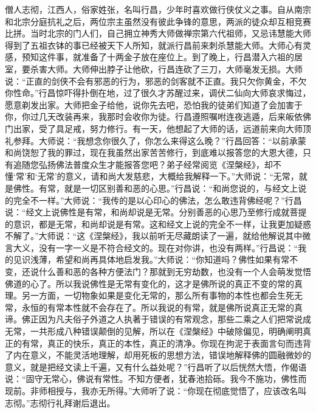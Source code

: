 \documentclass[12pt,twoside,openany]{book}
\newcommand{\kai}[1]{{\CJKfamily{kai}#1}}
\begin{document}
\kai{僧人志彻，江西人，俗家姓张，名叫行昌，少年时喜欢做行侠仗义之事。自从南宗和北宗分庭抗礼之后，两位宗主虽然没有彼此争锋的意思，两派的徒众却互相竞赛比拼。当时北宗的门人们，自己拥立神秀大师做禅宗第六代祖师，又忌讳慧能大师得到了五祖衣钵的事已经被天下人所知，就派行昌前来刺杀慧能大师。大师心有灵感，预知这件事，就准备了十两金子放在座位上。到了晚上，行昌潜入六祖的居室，要杀害大师。大师伸出脖子让他砍，行昌连砍了三刀，大师毫发无损。大师说：“正直的剑侠不会有邪恶的行为，邪恶的剑客就不正直。我只欠你黄金，不欠你性命。”行昌惊吓得扑倒在地，过了很久才苏醒过来，调伏二仙向大师哀求悔过，愿意剃发出家。大师把金子给他，说你先去吧，恐怕我的徒弟们知道了会加害于你，你过几天改装再来，我那时会收你为徒。行昌遵照嘱咐连夜逃遁，后来皈依佛门出家，受了具足戒，努力修行。有一天，他想起了大师的话，远道前来向大师顶礼参拜。大师说：“我想念你很久了，你怎么来得这么晚？”行昌回答：“以前承蒙和尚饶恕了我的罪过，现在我虽然出家苦苦修行，到底难以报答您的大恩大德，只有追随您弘扬佛法普度众生才能报答您吧？弟子经常阅览《涅槃经》，却不懂‘常’和‘无常’的意义，请和尚大发慈悲，大概给我解释一下。”大师说：“无常，就是佛性。有常，就是一切区别善和恶的心思。”行昌说：“和尚您说的，与经文上说的完全不一样。”大师说：“我传的是以心印心的佛法，怎么敢违背佛经呢？”行昌说：“经文上说佛性是有常，和尚却说是无常。分别善恶的心思乃至修行成就菩提的意识，都是无常，和尚却说是有常。这和经文上说的完全不一样，让我更加疑惑不解了。”大师说：“这《涅槃经》，我以前听无尽藏朗读了一遍，就给他解说其中微言大义，没有一字一义是不符合经文的。现在对你讲，也没有两样。”行昌说：“我的见识浅薄，希望和尚再具体地启发我。”大师说：“你知道吗？佛性如果有常不变，还说什么善和恶的各种方便法门？那就到无穷劫数，也没有一个人会萌发觉悟佛道的心了。所以我说佛性是无常有变化的，这才是佛所说的真正不变的常的真理。另一方面，一切物象如果是变化无常的，那么所有事物的本性也都会生死无常，永恒的有常本性就不会存在了。所以我说的有常，就是佛所说真正无常的真谛。佛正因为凡夫俗子外道之人执著于错误的有常观念，那些二乘之人们把常说成无常，一共形成八种错误颠倒的见解，所以在《涅槃经》中破除偏见，明确阐明真正的有常，真正的快乐，真正的本性，真正的清净。你现在拘泥于表面言句而违背了内在意义，不能灵活地理解，却用死板的思想方法，错误地解释佛的圆融微妙的意义，就是把经文读上千遍，又有什么益处呢？”行昌听了以后恍然大悟，作偈语说：“固守无常心，佛说有常性。不知方便者，犹春池拾砾。我今不施功，佛性而现前。非师相授与，我亦无所得。”大师听了说：“你现在彻底觉悟了，应该改名叫志彻。”志彻行礼拜谢后退出。}
\end{document}
